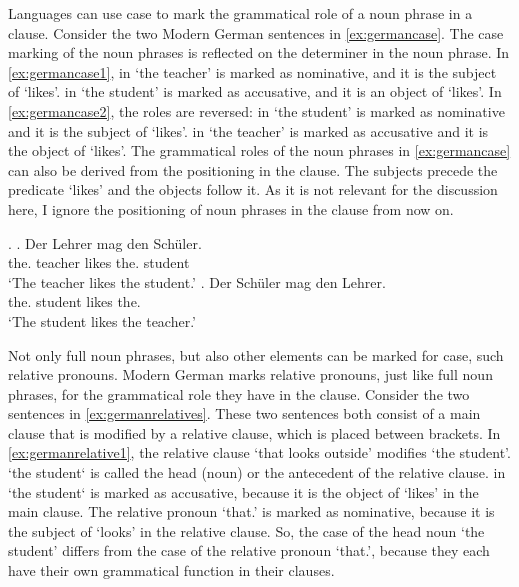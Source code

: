 Languages can use case to mark the grammatical role of a noun phrase in a clause. Consider the two Modern German sentences in \ref{ex:germancase}. The case marking of the noun phrases is reflected on the determiner in the noun phrase.
In \ref{ex:germancase1},  in  `the teacher' is marked as nominative, and it is the subject of  `likes'.  in  `the student' is marked as accusative, and it is an object of  `likes'.
In \ref{ex:germancase2}, the roles are reversed:  in  `the student' is marked as nominative and it is the subject of  `likes'.  in  `the teacher' is marked as accusative and it is the object of  `likes'.
The grammatical roles of the noun phrases in \ref{ex:germancase} can also be derived from the positioning in the clause. The subjects precede the predicate  `likes' and the objects follow it. As it is not relevant for the discussion here, I ignore the positioning of noun phrases in the clause from now on.

\ex.\label{ex:germancase}
\ag. Der Lehrer mag den Schüler.\\
 the. teacher likes the. student\\
 `The teacher likes the student.'\label{ex:germancase1}
\bg. Der Schüler mag den Lehrer.\\
 the. student likes the.\\
 `The student likes the teacher.'\label{ex:germancase2}

Not only full noun phrases, but also other elements can be marked for case, such relative pronouns. Modern German marks relative pronouns, just like full noun phrases, for the grammatical role they have in the clause. Consider the two sentences in \ref{ex:germanrelatives}. These two sentences both consist of a main clause that is modified by a relative clause, which is placed between brackets.
In \ref{ex:germanrelative1}, the relative clause  `that looks outside' modifies  `the student'.  `the student` is called the head (noun) or the antecedent of the relative clause.  in  `the student` is marked as accusative, because it is the object of  `likes' in the main clause. The relative pronoun  `that.' is marked as nominative, because it is the subject of  `looks' in the relative clause. So, the case of the head noun  `the student' differs from the case of the relative pronoun  `that.', because they each have their own grammatical function in their clauses.

